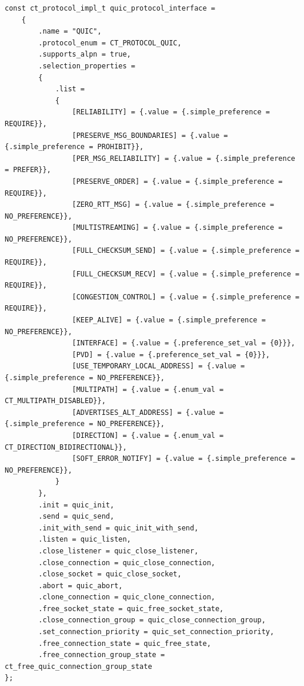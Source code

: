 \begin{listing}[htbp]
    \begin{verbatim}
const ct_protocol_impl_t quic_protocol_interface =
    {
        .name = "QUIC",
        .protocol_enum = CT_PROTOCOL_QUIC,
        .supports_alpn = true,
        .selection_properties =
        {
            .list =
            {
                [RELIABILITY] = {.value = {.simple_preference = REQUIRE}},
                [PRESERVE_MSG_BOUNDARIES] = {.value = {.simple_preference = PROHIBIT}},
                [PER_MSG_RELIABILITY] = {.value = {.simple_preference = PREFER}},
                [PRESERVE_ORDER] = {.value = {.simple_preference = REQUIRE}},
                [ZERO_RTT_MSG] = {.value = {.simple_preference = NO_PREFERENCE}},
                [MULTISTREAMING] = {.value = {.simple_preference = NO_PREFERENCE}},
                [FULL_CHECKSUM_SEND] = {.value = {.simple_preference = REQUIRE}},
                [FULL_CHECKSUM_RECV] = {.value = {.simple_preference = REQUIRE}},
                [CONGESTION_CONTROL] = {.value = {.simple_preference = REQUIRE}},
                [KEEP_ALIVE] = {.value = {.simple_preference = NO_PREFERENCE}},
                [INTERFACE] = {.value = {.preference_set_val = {0}}},
                [PVD] = {.value = {.preference_set_val = {0}}},
                [USE_TEMPORARY_LOCAL_ADDRESS] = {.value = {.simple_preference = NO_PREFERENCE}},
                [MULTIPATH] = {.value = {.enum_val = CT_MULTIPATH_DISABLED}},
                [ADVERTISES_ALT_ADDRESS] = {.value = {.simple_preference = NO_PREFERENCE}},
                [DIRECTION] = {.value = {.enum_val = CT_DIRECTION_BIDIRECTIONAL}},
                [SOFT_ERROR_NOTIFY] = {.value = {.simple_preference = NO_PREFERENCE}},
            }
        },
        .init = quic_init,
        .send = quic_send,
        .init_with_send = quic_init_with_send,
        .listen = quic_listen,
        .close_listener = quic_close_listener,
        .close_connection = quic_close_connection,
        .close_socket = quic_close_socket,
        .abort = quic_abort,
        .clone_connection = quic_clone_connection,
        .free_socket_state = quic_free_socket_state,
        .close_connection_group = quic_close_connection_group,
        .set_connection_priority = quic_set_connection_priority,
        .free_connection_state = quic_free_state,
        .free_connection_group_state = ct_free_quic_connection_group_state
};
    \end{verbatim}
    \caption[QUIC protocol interface struct]{QUIC protocol interface struct.}
    \label{lst:quic-impl-struct}
\end{listing}

